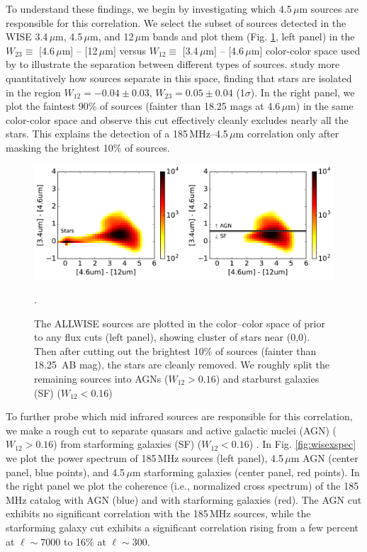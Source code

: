 \documentclass[numberedappendix]{emulateapj}
\begin{document}
To understand these findings, we begin by investigating which 4.5\,$\mu$m sources are responsible for this correlation. We select the subset of sources detected in the WISE 3.4\,$\mu$m, 4.5\,$\mu$m, and 12\,$\mu$m bands and plot them (Fig. \ref{fig:wisecolorcolor}, left panel) in the $W_{23}\equiv$ [4.6\,$\mu$m] -- [12\,$\mu$m] versus $W_{12}\equiv$ [3.4\,$\mu$m] -- [4.6\,$\mu$m] color-color space used by \citet{Wright2010} to illustrate the separation between different types of sources. \citet{nikutta14} study more quantitatively how sources separate in this space, finding that stars are isolated in the region $W_{12}=-0.04\pm0.03$, $W_{23}=0.05\pm0.04$ (1$\sigma$). In the right panel, we plot the faintest 90\% of sources (fainter than 18.25 mags at 4.6\,$\mu$m) in the same color-color space and observe this cut effectively cleanly excludes nearly all the stars. This explains the detection of a 185\,MHz--4.5\,$\mu$m correlation only after masking the brightest 10\% of sources. 

\begin{figure}[h]
\centering
\includegraphics[width=6in]{wise_color_color_figure_max=1e-3_5Jy.pdf}
\caption[Color-color plots of ALLWISE sources showing that cutting out the brightest 10\% cleanly removes the stars.]{The ALLWISE sources are plotted in the color--color space of \citet{Wright2010} prior to any flux cuts (left panel), showing cluster of stars near (0,0). Then after cutting out the brightest 10\% of sources (fainter than 18.25\, AB mag), the stars are cleanly removed. We roughly split the remaining sources into AGNs ($W_{12}>0.16$) and starburst galaxies (SF) ($W_{12}<0.16$) \citep{nikutta14,kurcz16}}.
\label{fig:wisecolorcolor}
\end{figure}

To further probe which mid infrared sources are responsible for this correlation, we make a rough cut to separate quasars and active galactic nuclei (AGN) ($W_{12}>0.16$) from starforming galaxies (SF) ($W_{12}<0.16$) \citep{nikutta14,kurcz16}. In Fig. \ref{fig:wisexspec} we plot the power spectrum of 185\,MHz sources (left panel), 4.5\,$\mu$m AGN (center panel, blue points), and 4.5\,$\mu$m starforming galaxies (center panel, red points). In the right panel we plot the coherence (i.e., normalized cross spectrum) of the 185\,MHz catalog with AGN (blue) and with starforming galaxies (red). The AGN cut exhibits no significant correlation with the 185\,MHz sources, while the starforming galaxy cut exhibits a significant correlation rising from a few percent at $\ell\sim7000$ to 16\% at $\ell\sim300$. 
\end{document}
